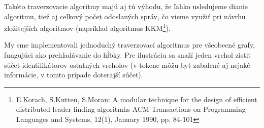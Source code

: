Takéto traverzovacie algoritmy majú aj tú výhodu, že ľahko usledujeme dianie algoritmu, tiež aj celkový počet odoslaných
správ, čo vieme využiť pri návrhu zložitejších algoritmov (napríklad algoritmus
KKM\footnote{E.Korach, S.Kutten, S.Moran: A modular technique for the design of efficient
distributed leader finding algoritmhs ACM Transactions on Programming Languages and Systems, 12(1),
January 1990, pp. 84-101}).

My sme implementovali jednoduchý traverzovací algoritmus pre všeobecné grafy, fungujúci ako 
prehľadávanie do hĺbky. Pre ilustráciu sa snaží jeden vrchol zistiť súčet identifikátorov ostatných
vrcholov (v tokene môžu byť zabalené aj nejaké informácie, v tomto prípade doterajší súčet).






